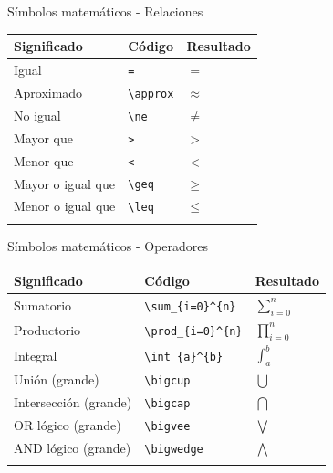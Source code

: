 \documentclass[
  ignorenonframetext,
  aspectratio=169]{beamer}
\begin{document}
\begin{frame}[fragile]{Símbolos matemáticos - Relaciones}
\label{suxedmbolos-matemuxe1ticos---relaciones}
\begin{longtable}[]{@{}lll@{}}
\toprule\noalign{}
Significado & Código & Resultado \\
\midrule\noalign{}
\endhead
Igual & \texttt{=} & \(=\) \\
Aproximado & \texttt{\textbackslash{}approx} & \(\approx\) \\
No igual & \texttt{\textbackslash{}ne} & \(\ne\) \\
Mayor que & \texttt{\textgreater{}} & \(>\) \\
Menor que & \texttt{\textless{}} & \(<\) \\
Mayor o igual que & \texttt{\textbackslash{}geq} & \(\geq\) \\
Menor o igual que & \texttt{\textbackslash{}leq} & \(\leq\) \\
\bottomrule\noalign{}
\end{longtable}
\end{frame}

\begin{frame}[fragile]{Símbolos matemáticos - Operadores}
\label{suxedmbolos-matemuxe1ticos---operadores}
\begin{longtable}[]{@{}lll@{}}
\toprule\noalign{}
Significado & Código & Resultado \\
\midrule\noalign{}
\endhead
Sumatorio & \texttt{\textbackslash{}sum\_\{i=0\}\^{}\{n\}} &
\(\sum_{i=0}^{n}\) \\
Productorio & \texttt{\textbackslash{}prod\_\{i=0\}\^{}\{n\}} &
\(\prod_{i=0}^{n}\) \\
Integral & \texttt{\textbackslash{}int\_\{a\}\^{}\{b\}} &
\(\int_{a}^{b}\) \\
Unión (grande) & \texttt{\textbackslash{}bigcup} & \(\bigcup\) \\
Intersección (grande) & \texttt{\textbackslash{}bigcap} & \(\bigcap\) \\
OR lógico (grande) & \texttt{\textbackslash{}bigvee} & \(\bigvee\) \\
AND lógico (grande) & \texttt{\textbackslash{}bigwedge} &
\(\bigwedge\) \\
\bottomrule\noalign{}
\end{longtable}
\end{frame}
\end{document}
